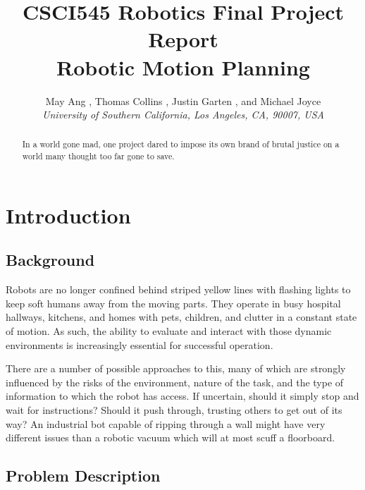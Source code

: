 \documentclass{aiaa-tc}%
\begin{document}
\title{CSCI545 Robotics Final Project Report\\
	Robotic Motion Planning}

 \author
{		May Ang%
		\hspace{3pt},
		Thomas Collins%
		\hspace{3pt},
		Justin Garten%
		\hspace{3pt},
		and Michael Joyce%
		\\
		\normalsize\itshape
		University of Southern California, Los Angeles, CA, 90007, USA\\
}
\maketitle

\begin{abstract}
In a world gone mad, one project dared to impose its own brand of
brutal justice on a world many thought too far gone to save.
\end{abstract}

\section{Introduction}
\label{Introduction}

\subsection{Background}

Robots are no longer confined behind striped yellow lines
with flashing lights to keep soft humans away from the moving
parts. They operate in busy hospital hallways, kitchens, and homes
with pets, children, and clutter in a constant state of motion. As
such, the ability to evaluate and interact with those dynamic environments is
increasingly essential for successful operation.

There are a number of possible approaches to this, many of which are
strongly influenced by the risks of the environment, nature of the
task, and the type of information to which the robot has
access. If uncertain, should it simply stop and wait for instructions?
Should it push through, trusting others to get out of its way? An
industrial bot capable of ripping through a wall might have very
different issues than a robotic vacuum which will at most scuff a
floorboard.

\subsection{Problem Description}
\end{document}
